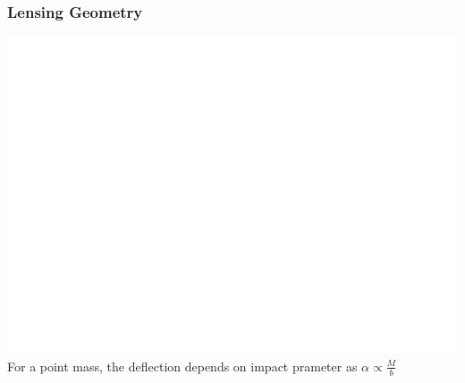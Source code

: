 \documentclass{beamer}
\begin{document}


\frame
{
    \frametitle{Lensing Geometry}

    \begin{center}
        \includegraphics[scale=0.4]{lens_geometry_invert.pdf}
        \newline
        For a point mass, the deflection depends on impact
        prameter as
        \newline
        {\huge {\color{gold} $\alpha \propto \frac{M}{b}$ }}
    \end{center}
}
\end{document}
